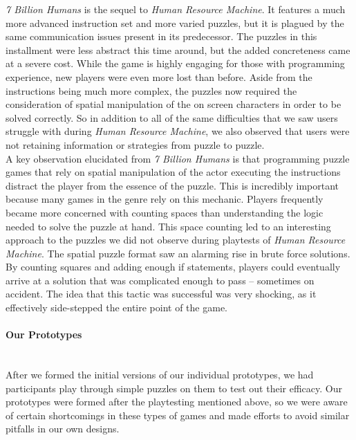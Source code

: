 \textit{7 Billion Humans} is the sequel to \textit{Human Resource Machine}.  It features a much more advanced instruction set and more varied puzzles, but it is plagued by the same communication issues present in its predecessor. The puzzles in this installment were less abstract this time around, but the added concreteness came at a severe cost. While the game is highly engaging for those with programming experience, new players were even more lost than before. Aside from the instructions being much more complex, the puzzles now required the consideration of spatial manipulation of the on screen characters in order to be solved correctly. So in addition to all of the same difficulties that we saw users struggle with during \textit{Human Resource Machine}, we also observed that users were not retaining information or strategies from puzzle to puzzle.\\

A key observation elucidated from \textit{7 Billion Humans} is that programming puzzle games that rely on spatial manipulation of the actor executing the instructions distract the player from the essence of the puzzle. This is incredibly important because many games in the genre rely on this mechanic. Players frequently became more concerned with counting spaces than understanding the logic needed to solve the puzzle at hand. This space counting led to an interesting approach to the puzzles we did not observe during playtests of \textit{Human Resource Machine}. The spatial puzzle format saw an alarming rise in brute force solutions. By counting squares and adding enough if statements, players could eventually arrive at a solution that was complicated enough to pass -- sometimes on accident. The idea that this tactic was successful was very shocking, as it effectively side-stepped the entire point of the game.\\

\paragraph{Our Prototypes}\mbox{} \\
After we formed the initial versions of our individual prototypes, we had participants play through simple puzzles on them to test out their efficacy. Our prototypes were formed after the playtesting mentioned above, so we were aware of certain shortcomings in these types of games and made efforts to avoid similar pitfalls in our own designs.\\

